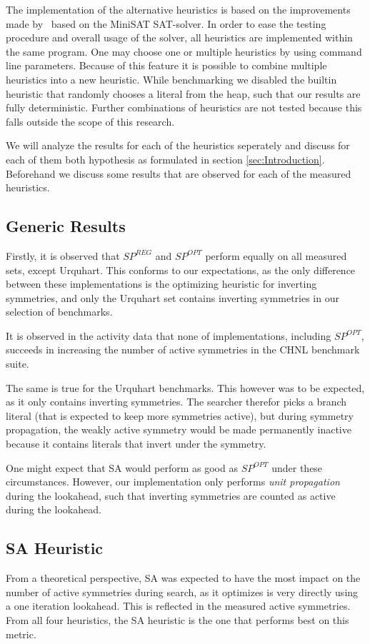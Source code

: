 The implementation of the alternative heuristics is based on the improvements
made by~\cite{devriendt2012symmetry} based on the MiniSAT SAT-solver.
In order to ease the testing procedure and overall usage of the solver, all heuristics
are implemented within the same program. One may choose one or multiple heuristics
by using command line parameters. Because of this feature it is possible to combine
multiple heuristics into a new heuristic.
While benchmarking we disabled the builtin heuristic that randomly chooses a literal from the heap,
such that our results are fully deterministic.
Further combinations of heuristics are not tested because this falls outside the scope
of this research.

We will analyze the results for each of the heuristics seperately and discuss for each of them both
hypothesis as formulated in section \ref{sec:Introduction}.
Beforehand we discuss some results that are observed for each of the measured heuristics.

\subsection{Generic Results}
	Firstly, it is observed that $SP^{REG}$ and $SP^{OPT}$ perform equally on all measured sets,
	except Urquhart.
	This conforms to our expectations, as the only difference between these implementations is the
	optimizing heuristic for inverting symmetries, and only the Urquhart set contains inverting
	symmetries in our selection of benchmarks.

	It is observed in the activity data that none of implementations, including $SP^{OPT}$,
	succeeds in increasing the number of active symmetries in the CHNL benchmark suite.

	The same is true for the Urquhart benchmarks.
	This however was to be expected, as it only contains inverting symmetries.
	The searcher therefor picks a branch literal (that is expected to keep more symmetries active),
	but during symmetry propagation, the weakly active symmetry would be made permanently inactive
	because it contains literals that invert under the symmetry.

	One might expect that SA would perform as good as $SP^{OPT}$ under these circumstances.
	However, our implementation only performs \emph{unit propagation} during the lookahead, such
	that inverting symmetries are counted as active during the lookahead.

\subsection{SA Heuristic}
	From a theoretical perspective, SA was expected to have the most impact on the number of active
	symmetries during search, as it optimizes is very directly using a one iteration lookahead.
	This is reflected in the measured active symmetries.
	From all four heuristics, the SA heuristic is the one that performs best on this metric.

